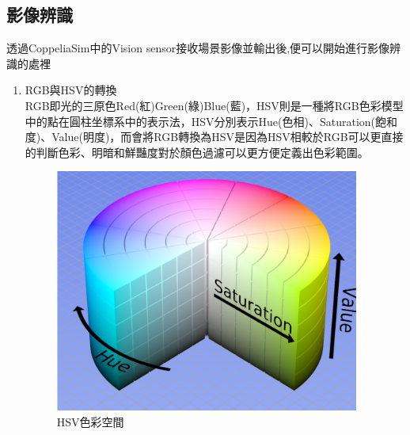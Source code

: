 \documentclass[14pt,a4paper]{report}  %
\begin{document}
\subsection{影像辨識}
 透過CoppeliaSim中的Vision sensor接收場景影像並輸出後,便可以開始進行影像辨識的處裡\\
\begin{enumerate}
\item RGB與HSV的轉換\\
RGB即光的三原色Red(紅)Green(綠)Blue(藍)，HSV則是一種將RGB色彩模型中的點在圓柱坐標系中的表示法，HSV分別表示Hue(色相)、Saturation(飽和度)、Value(明度)，而會將RGB轉換為HSV是因為HSV相較於RGB可以更直接的判斷色彩、明暗和鮮豔度對於顏色過濾可以更方便定義出色彩範圍。\\
\begin{figure}[hbt!]
\center
\includegraphics[width=10cm]{HSV}
\caption{\Large HSV色彩空間}
\label{HSV色彩空間}
\end{figure}


\end{enumerate}
\end{document}

